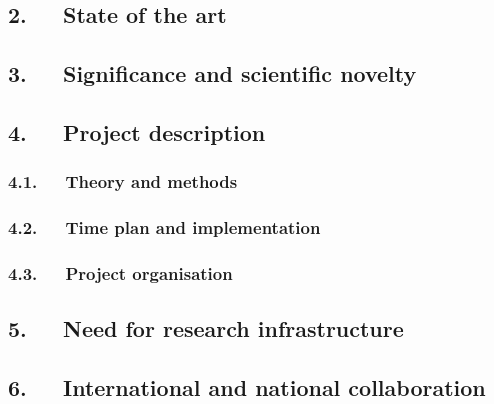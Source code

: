 \documentclass[a4paper,11pt]{article}
\begin{document}
\subsection*{2.~~~State of the art}

\subsection*{3.~~~Significance and scientific novelty}

\subsection*{4.~~~Project description}


\subsubsection*{4.1.~~~Theory and methods}

\subsubsection*{4.2.~~~Time plan and implementation}

\subsubsection*{4.3.~~~Project organisation}



\subsection*{5.~~~Need for research infrastructure}

\subsection*{6.~~~International and national collaboration}


\end{document}
